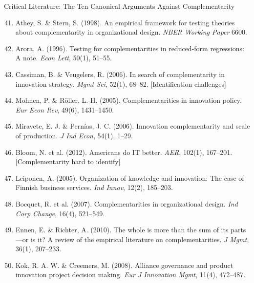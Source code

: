 \begin{chapter}{Critical Literature: The Ten Canonical Arguments Against Complementarity}
\begin{enumerate}
    \setcounter{enumi}{40}
    \item Athey, S. \& Stern, S. (1998). An empirical framework for testing theories about complementarity in organizational design. \textit{NBER Working Paper} 6600.

    \item Arora, A. (1996). Testing for complementarities in reduced-form regressions: A note. \textit{Econ Lett}, 50(1), 51--55.

    \item Cassiman, B. \& Veugelers, R. (2006). In search of complementarity in innovation strategy. \textit{Mgmt Sci}, 52(1), 68--82. [Identification challenges]

    \item Mohnen, P. \& Röller, L.-H. (2005). Complementarities in innovation policy. \textit{Eur Econ Rev}, 49(6), 1431--1450.

    \item Miravete, E. J. \& Pernías, J. C. (2006). Innovation complementarity and scale of production. \textit{J Ind Econ}, 54(1), 1--29.

    \item Bloom, N. et al. (2012). Americans do IT better. \textit{AER}, 102(1), 167--201. [Complementarity hard to identify]

    \item Leiponen, A. (2005). Organization of knowledge and innovation: The case of Finnish business services. \textit{Ind Innov}, 12(2), 185--203.

    \item Bocquet, R. et al. (2007). Complementarities in organizational design. \textit{Ind Corp Change}, 16(4), 521--549.

    \item Ennen, E. \& Richter, A. (2010). The whole is more than the sum of its parts—or is it? A review of the empirical literature on complementarities. \textit{J Mgmt}, 36(1), 207--233.

    \item Kok, R. A. W. \& Creemers, M. (2008). Alliance governance and product innovation project decision making. \textit{Eur J Innovation Mgmt}, 11(4), 472--487.
\end{enumerate}


\end{chapter}
